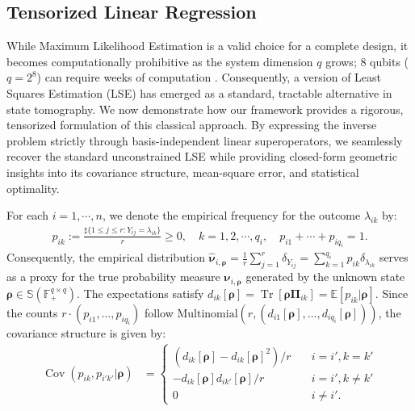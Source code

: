 \documentclass[noinfoline]{imsart}\setcounter{tocdepth}{2}
\renewcommand{\b}[1]{\mathbb{#1}} %
\newcommand{\m}[1]{\mathbf{#1}} %
\newcommand{\mb}[1]{\boldsymbol{#1}} %
\newcommand{\tr}[1]{\operatorname{Tr}\left[#1\right]}
\newcommand{\Cov}{\operatorname{Cov}}
\theoremstyle{plain}
\begin{document}
\subsection{Tensorized Linear Regression}\label{ssec:est:sch}
While Maximum Likelihood Estimation is a valid choice for a complete design, it becomes computationally prohibitive as the system dimension $q$ grows; 8 qubits ($q=2^{8}$) can require weeks of computation \cite{gross2010quantum, haffner2005scalable}. Consequently, a version of Least Squares Estimation (LSE) \cite{smolin2012efficient} has emerged as a standard, tractable alternative in state tomography. We now demonstrate how our framework provides a rigorous, tensorized formulation of this classical approach. By expressing the inverse problem strictly through basis-independent linear superoperators, we seamlessly recover the standard unconstrained LSE while providing closed-form geometric insights into its covariance structure, mean-square error, and statistical optimality.

For each $i= 1, \cdots, n$, we denote the empirical frequency for the outcome $\lambda_{ik}$ by:
\begin{align*}
    p_{ik} := \frac{\sharp \{1 \le j \le r : Y_{ij} = \lambda_{ik} \}}{r} \ge 0, \quad k=1, 2, \cdots, q_{i}, \quad p_{i1} + \cdots + p_{iq_{i}} = 1.
\end{align*}
Consequently, the empirical distribution $\hat{\mb{\nu}}_{i, \mb{\rho}} = \frac{1}{r} \sum_{j=1}^{r} \delta_{Y_{ij}} = \sum_{k=1}^{q_{i}} p_{ik} \delta_{\lambda_{ik}}$
serves as a proxy for the true probability measure $\mb{\nu}_{i, \mb{\rho}}$ generated by the unknown state $\mb{\rho} \in \b{S}(\b{F}_{+}^{q \times q})$. The expectations satisfy $d_{ik}[\mb{\rho}] = \tr{\mb{\rho} \m{\Pi}_{ik}} = \b{E}[p_{ik} \vert \mb{\rho}]$. Since the counts $r \cdot (p_{i1}, \dots, p_{iq_{i}})$ follow  $\text{Multinomial}(r, (d_{i1}[\mb{\rho}], \dots, d_{iq_{i}}[\mb{\rho}]))$, the covariance structure is given by:
\begin{align}\label{eq:multinom:cov}
    \Cov (p_{ik}, p_{i'k'}  \vert \mb{\rho}) 
    &= \begin{cases}
        (d_{ik}[\mb{\rho}] - d_{ik}[\mb{\rho}]^{2})/r & \quad i=i', k=k' \\
        - d_{ik}[\mb{\rho}] d_{ik'}[\mb{\rho}]/r & \quad i=i', k \neq k' \\
        0 & \quad i \neq i'.
    \end{cases}
\end{align}
\end{document}
